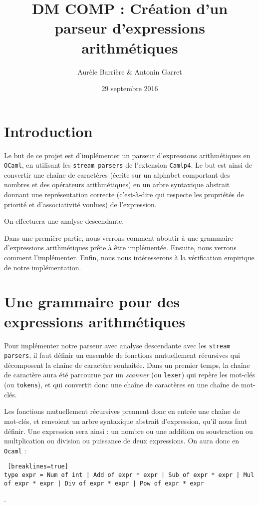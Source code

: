 \documentclass[11pt]{article}
\title{DM COMP : Création d'un parseur d'expressions arithmétiques}
\author{Aurèle Barrière \& Antonin Garret}
\date{29 septembre 2016}
\begin{document}
\maketitle

\section{Introduction}
Le but de ce projet est d'implémenter un parseur d'expressions arithmétiques en \texttt{OCaml}, en utilisant les \texttt{stream parsers} de l'extension \texttt{Camlp4}. Le but est ainsi de convertir une chaîne de caractères (écrite sur un alphabet comportant des nombres et des opérateurs arithmétiques) en un arbre syntaxique abstrait donnant une représentation correcte (c'est-à-dire qui respecte les propriétés de priorité et d'associativité voulues) de l'expression.

On effectuera une analyse descendante.


Dans une première partie, nous verrons comment aboutir à une grammaire d'expressions arithmétiques prête à être implémentée. Ensuite, nous verrons comment l'implémenter. Enfin, nous nous intéresserons à la vérification empirique de notre implémentation.

\section{Une grammaire pour des expressions arithmétiques}

Pour implémenter notre parseur avec analyse descendante avec les \texttt{stream parsers}, il faut définir un ensemble de fonctions mutuellement récursives qui décomposent la chaîne de caractère souhaitée. Dans un premier temps, la chaîne de caractère aura été parcourue par un \textit{scanner} (ou \texttt{lexer}) qui repère les mot-clés (ou \texttt{tokens}), et qui convertit donc une chaîne de caractères en une chaîne de mot-clés.

Les fonctions mutuellement récursives prennent donc en entrée une chaîne de mot-clés, et renvoient un arbre syntaxique abstrait d'expression, qu'il nous faut définir. Une expression sera ainsi : un nombre ou une addition ou soustraction ou multplication ou division ou puissance de deux expressions. On aura donc en \texttt{Ocaml} : 
\begin{lstlisting} [breaklines=true]
type expr = Num of int | Add of expr * expr | Sub of expr * expr | Mul of expr * expr | Div of expr * expr | Pow of expr * expr 
\end{lstlisting}.
\end{document}

